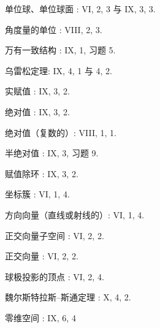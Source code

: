 单位球、单位球面 : VI, 2, 3 与 IX, 3, 3.

角度量的单位 : VIII, 2, 3.

万有一致结构 : IX, 1, 习题 5.

乌雷松定理: IX, 4, 1 与 4, 2.

实赋值 : IX, 3, 2.

绝对值 : IX, 3, 2.

绝对值（复数的）: VIII, 1, 1.

半绝对值 : IX, 3, 习题 9.

赋值除环 : IX, 3, 2.

坐标簇 : VI, 1, 4.

方向向量（直线或射线的）: VI, 1, 4.

正交向量子空间 : VI, 2, 2.

正交向量 : VI, 2, 2.

球极投影的顶点 : VI, 2, 4.

魏尔斯特拉斯–斯通定理 : X, 4, 2.

零维空间 : IX, 6, 4
